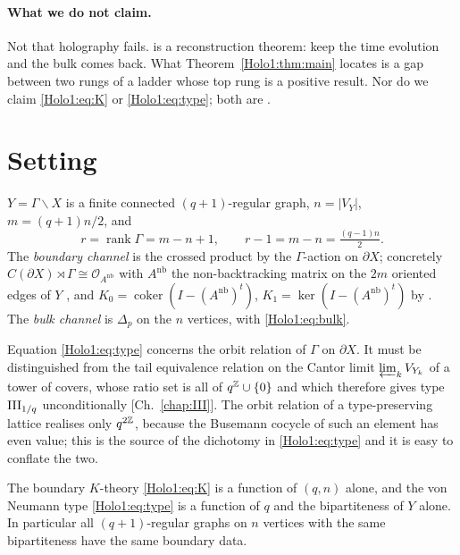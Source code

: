 \paragraph{What we do not claim.}
Not that holography fails. \cite{CM13} is a reconstruction theorem: keep the time
evolution and the bulk comes back. What Theorem~\ref{Holo1:thm:main} locates is a gap between two
rungs of a ladder whose top rung is a positive result. Nor do we claim \eqref{Holo1:eq:K} or
\eqref{Holo1:eq:type}; both are \cite{Rob05}.

\section{Setting}\label{Holo1:sec:setting}

$Y=\Gamma\backslash X$ is a finite connected $(q{+}1)$-regular graph, $n=|V_Y|$,
$m=(q{+}1)n/2$, and
\[
r=\operatorname{rank}\Gamma=m-n+1,\qquad r-1=m-n=\tfrac{(q-1)n}{2}.
\]
The \emph{boundary channel} is the crossed product by the $\Gamma$-action on $\partial X$;
concretely $C(\partial X)\rtimes\Gamma\cong\mathcal O_{A^{\mathrm{nb}}}$ with
$A^{\mathrm{nb}}$ the non-backtracking matrix on the $2m$ oriented edges of $Y$
\cite{Rob05}, and $K_0=\operatorname{coker}(I-(A^{\mathrm{nb}})^{t})$,
$K_1=\ker(I-(A^{\mathrm{nb}})^{t})$ by \cite{Cuntz81}. The \emph{bulk channel} is
$\Delta_p$ on the $n$ vertices, with \eqref{Holo1:eq:bulk}.

\begin{remark}\label{Holo1:rem:tworel}
Equation \eqref{Holo1:eq:type} concerns the orbit relation of $\Gamma$ on $\partial X$. It must
be distinguished from the tail equivalence relation on the Cantor limit
$\varprojlim_kV_{Y_k}$ of a tower of covers, whose ratio set is all of $q^{\mathbb{Z}}\cup\{0\}$
and which therefore gives type $\mathrm{III}_{1/q}$ unconditionally [Ch.~\ref{chap:III}]. The orbit
relation of a type-preserving lattice realises only $q^{2\mathbb{Z}}$, because the Busemann cocycle
of such an element has even value; this is the source of the dichotomy in \eqref{Holo1:eq:type}
and it is easy to conflate the two.
\end{remark}

\begin{proposition}\label{Holo1:prop:coarse}
The boundary $K$-theory \eqref{Holo1:eq:K} is a function of $(q,n)$ alone, and the von Neumann
type \eqref{Holo1:eq:type} is a function of $q$ and the bipartiteness of $Y$ alone. In
particular all $(q{+}1)$-regular graphs on $n$ vertices with the same bipartiteness have
the same boundary data.
\end{proposition}


